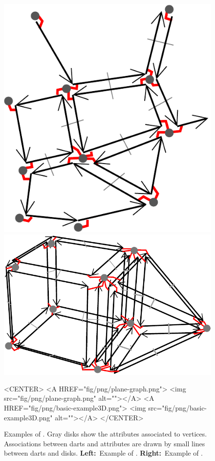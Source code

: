 \begin{figure}
\begin{ccTexOnly}
  \centerline{\includegraphics[width=.25\textwidth]
    {Linear_cell_complex/fig/pdf/plane-graph}
  \qquad
  \includegraphics[width=.45\textwidth]
  {Linear_cell_complex/fig/pdf/basic-example3D}}
\end{ccTexOnly}
\begin{ccHtmlOnly}
  <CENTER>
  <A HREF="fig/png/plane-graph.png">
      <img src="fig/png/plane-graph.png" alt=""></A>
  <A HREF="fig/png/basic-example3D.png">
      <img src="fig/png/basic-example3D.png" alt=""></A>
  </CENTER>
\end{ccHtmlOnly}
\caption{Examples of . Gray disks show the
  attributes associated to vertices. Associations between darts and
  attributes are drawn by small lines between darts and disks.
  \textbf{Left:}~Example of .
  \textbf{Right:}~Example of .}
\label{fig-combi_map_with_point}
\end{figure}
%

